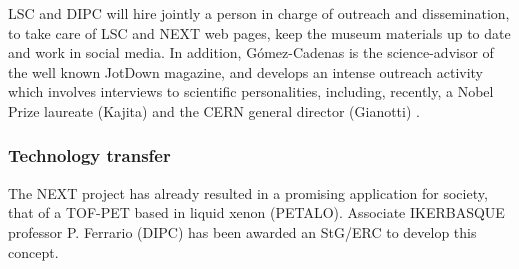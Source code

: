 \indent

LSC and DIPC will hire jointly a person in charge of outreach and dissemination, to take care of LSC and NEXT web pages, keep the museum materials up to date and work in social media. In addition, G\'omez-Cadenas
is the science-advisor of the well known JotDown magazine, and develops an intense outreach activity which involves interviews to scientific personalities, including, recently, a Nobel Prize laureate (Kajita) and the CERN general director (Gianotti) .

\subsubsection{Technology transfer}
The NEXT project has already resulted in a promising application for society, that of a TOF-PET based in liquid xenon (PETALO). Associate IKERBASQUE professor P. Ferrario (DIPC) has been awarded an StG/ERC to develop this concept.


